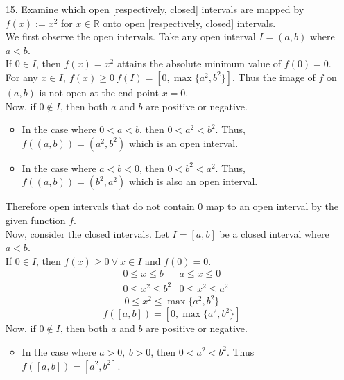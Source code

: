 \documentclass[12pt,letterpaper]{article}
\newcommand{\R}{\mathbb{R}}
\theoremstyle{case}
\theoremstyle{definition}
\begin{document}
\begin{enumerate}
\begin{enumerate}
				\item[15.] Examine which open [respectively, closed] intervals are mapped by $f(x):=x^2$ for $x \in \R$ onto open [respectively, closed] intervals.\\
				
				We first observe the open intervals. Take any open interval $I=(a,b)$ where $a<b$.\\
				
				If $0 \in I$, then $f(x)=x^2$ attains the absolute minimum value of $f(0)=0$. For any $x \in I,\ f(x) \geq 0\ f(I)=[0,\max \{a^2, b^2\}]$. Thus the image of $f$ on $(a,b)$ is not open at the end point $x=0$.\\
				
				Now, if $0 \notin I$, then both $a$ and $b$ are positive or negative.
				\begin{itemize}
					\item In the case where $0<a<b$, then $0 < a^2 < b^2$. Thus, $f((a,b))=(a^2,b^2)$ which is an open interval.
					
					\item In the case where $a < b < 0$, then $0 < b^2 < a^2$. Thus, $f((a,b))=(b^2,a^2)$ which is also an open interval.
				\end{itemize}
				Therefore open intervals that do not contain $0$ map to an open interval by the given function $f$.\\
				
				Now, consider the closed intervals. Let $I=[a,b]$ be a closed interval where $a<b$.\\
				
				If $0 \in I$, then $f(x) \geq 0\ \forall\ x \in I$ and $f(0)=0$.
				\begin{align*}
					&0 \leq x \leq b &a \leq x \leq 0 \\
					&0 \leq x^2 \leq b^2 &0 \leq x^2 \leq a^2
				\end{align*}
				\[0\leq x^2 \leq \max \{a^2, b^2\}\]
				\[f([a,b])=[0, \max \{a^2, b^2\}]\]
				Now, if $0 \notin I$, then both $a$ and $b$ are positive or negative.
				\begin{itemize}
					\item In the case where $a>0,\ b>0$, then $0<a^2<b^2$. Thus $f([a,b])=[a^2,b^2]$.
					

\end{itemize}
\end{enumerate}
\end{enumerate}
\end{document}
